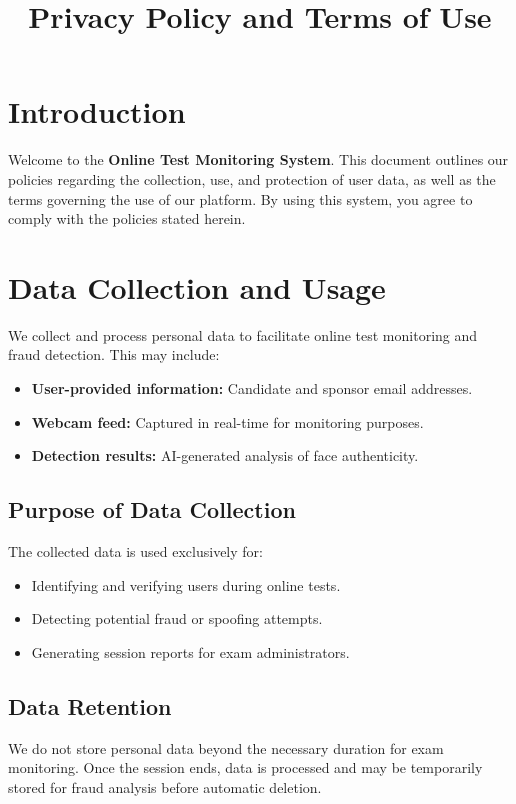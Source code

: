 \documentclass[a4paper,12pt]{article}
\title{Privacy Policy and Terms of Use}
\author{}
\date{} %
\begin{document}
\maketitle

\section{Introduction}
Welcome to the \textbf{Online Test Monitoring System}. This document outlines our policies regarding the collection, use, and protection of user data, as well as the terms governing the use of our platform. By using this system, you agree to comply with the policies stated herein.

\section{Data Collection and Usage}
We collect and process personal data to facilitate online test monitoring and fraud detection. This may include:
\begin{itemize}
    \item \textbf{User-provided information:} Candidate and sponsor email addresses.
    \item \textbf{Webcam feed:} Captured in real-time for monitoring purposes.
    \item \textbf{Detection results:} AI-generated analysis of face authenticity.
\end{itemize}

\subsection{Purpose of Data Collection}
The collected data is used exclusively for:
\begin{itemize}
    \item Identifying and verifying users during online tests.
    \item Detecting potential fraud or spoofing attempts.
    \item Generating session reports for exam administrators.
\end{itemize}

\subsection{Data Retention}
We do not store personal data beyond the necessary duration for exam monitoring. Once the session ends, data is processed and may be temporarily stored for fraud analysis before automatic deletion.
\end{document}
